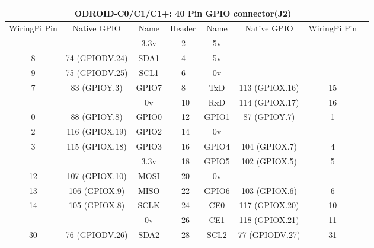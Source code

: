 \documentclass[11pt,a4paper]{article}
\begin{document}
\begin{sffamily}
\begin{center}
\begin{tabular}{|c|c|c||p{8mm}|p{8mm}||c|c|c|c|}
\hline
\multicolumn{8}{|c|}{\bfseries{ODROID-C0/C1/C1+: 40 Pin GPIO connector(J2)}}\\
\hline
\hline
WiringPi Pin	& Native GPIO	& Name	& \multicolumn{2}{|c||}{Header}	& Name	& Native GPIO	& WiringPi Pin\\
\hline
\hline
	& 		& \textcolor{rtb-red}{3.3v}	& \raggedleft{1} &  2 & \textcolor{rtb-maroon}{5v}	& 		& \\
\hline
8	& 74 (GPIODV.24)	& \textcolor{rtb-aqua}{SDA1}	& \raggedleft{3} &  4 & \textcolor{rtb-maroon}{5v}		& 					& \\
\hline
9	& 75 (GPIODV.25)	& \textcolor{rtb-aqua}{SCL1}	& \raggedleft{5} &  6 & \textcolor{rtb-black}{0v}		& 					& \\
\hline
7	& 83 (GPIOY.3)		& \textcolor{rtb-green}{GPIO7}	& \raggedleft{7} &  8 & \textcolor{rtb-yellow}{TxD}		& 113 (GPIOX.16)	& 15\\
\hline
	& 					& \textcolor{rtb-black}{0v}		& \raggedleft{9} & 10 & \textcolor{rtb-yellow}{RxD}		& 114 (GPIOX.17)	& 16\\
\hline
0	& 88 (GPIOY.8)		& \textcolor{rtb-green}{GPIO0}	& \raggedleft{11} & 12 & \textcolor{rtb-green}{GPIO1}	& 87 (GPIOY.7)		& 1\\
\hline
2	& 116 (GPIOX.19)	& \textcolor{rtb-green}{GPIO2}	& \raggedleft{13} & 14 & \textcolor{rtb-black}{0v}		& 					& \\
\hline
3	& 115 (GPIOX.18)	& \textcolor{rtb-green}{GPIO3}	& \raggedleft{15} & 16 & \textcolor{rtb-green}{GPIO4}	& 104 (GPIOX.7)		& 4\\
\hline
	& 					& \textcolor{rtb-red}{3.3v}		& \raggedleft{17} & 18 & \textcolor{rtb-green}{GPIO5}	& 102 (GPIOX.5)		& 5\\
\hline
12	& 107 (GPIOX.10)	& \textcolor{rtb-teal}{MOSI}	& \raggedleft{19} & 20 & \textcolor{rtb-black}{0v}		& 					& \\
\hline
13	& 106 (GPIOX.9)		& \textcolor{rtb-teal}{MISO}	& \raggedleft{21} & 22 & \textcolor{rtb-green}{GPIO6}	& 103 (GPIOX.6)		& 6\\
\hline
14	& 105 (GPIOX.8)		& \textcolor{rtb-teal}{SCLK}	& \raggedleft{23} & 24 & \textcolor{rtb-teal}{CE0}		& 117 (GPIOX.20)	& 10\\
\hline
	& 					& \textcolor{rtb-black}{0v}		& \raggedleft{25} & 26 & \textcolor{rtb-teal}{CE1}		& 118 (GPIOX.21)	& 11\\
\hline
30	& 76 (GPIODV.26)	& \textcolor{rtb-aqua}{SDA2}	& \raggedleft{27} & 28 & \textcolor{rtb-aqua}{SCL2}		& 77 (GPIODV.27)	& 31\\

\end{tabular}
\end{center}
\end{sffamily}
\end{document}
